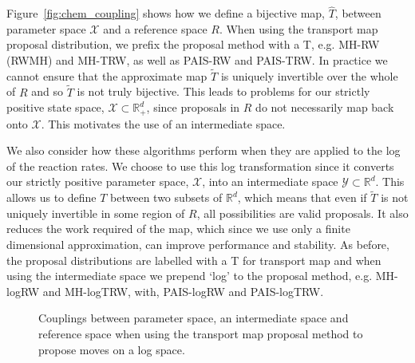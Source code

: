 \documentclass[final]{siamltex}
\newcommand\irregularcircle[2]{%
  \pgfextra {\pgfmathsetmacro\len{(#1)+rand*(#2)}}
  +(0:\len pt)
  \foreach \a in {10,20,...,350}{
    \pgfextra {\pgfmathsetmacro\len{(#1)+rand*(#2)}}
    -- +(\a:\len pt)
  } -- cycle
}
\begin{document}
Figure~\ref{fig:chem_coupling} shows how we define a bijective map,
$\hat{T}$, between parameter space $\mathcal{X}$ and a reference space
$R$. When using the transport map proposal distribution, we prefix the proposal method with a T, e.g. MH-RW (RWMH) and MH-TRW, as well as PAIS-RW and PAIS-TRW. In practice we cannot ensure that the approximate map $\tilde{T}$
is uniquely invertible over the whole of $R$ and so $\tilde{T}$ is not
truly bijective. This leads to problems for our strictly positive
state space, $\mathcal{X} \subset \mathbb{R}_+^d$, since proposals in
$R$ do not necessarily map back onto $\mathcal{X}$. This motivates the
use of an intermediate space. 

We also consider how these algorithms perform when they are applied to
the log of the reaction rates. We choose to use this log
transformation since it converts our strictly positive parameter
space, $\mathcal{X}$, into an intermediate space $\mathcal{Y} \subset
\mathbb{R}^d$. This allows us to define $T$ between two subsets of
$\mathbb{R}^d$, which means that even if $\tilde{T}$ is not uniquely
invertible in some region of $R$, all possibilities are valid
proposals. It also reduces the work required of the map, which since
we use only a finite dimensional approximation, can improve
performance and stability. As before, the proposal distributions are labelled with a T for transport map and when using the intermediate space we prepend `log' to the proposal method, e.g. MH-logRW and MH-logTRW, with, PAIS-logRW and PAIS-logTRW.

\begin{figure}
	\centering
	\caption{Couplings between parameter space, an intermediate space and reference space when using the transport map proposal method to propose moves on a log space.}
	\label{fig:chem_log_coupling}
\end{figure}
\end{document}
